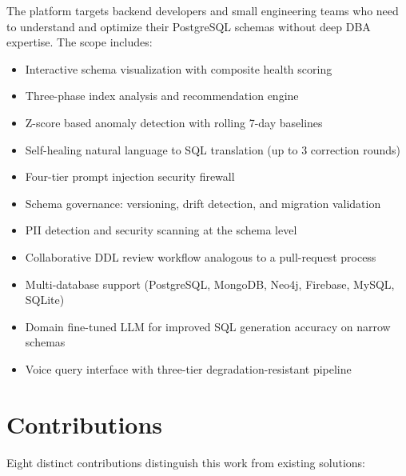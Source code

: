 \documentclass[12pt,a4paper]{report}
\begin{document}
The platform targets backend developers and small engineering teams who need to understand and optimize their PostgreSQL schemas without deep DBA expertise. The scope includes:

\begin{itemize}
    \item Interactive schema visualization with composite health scoring
    \item Three-phase index analysis and recommendation engine
    \item Z-score based anomaly detection with rolling 7-day baselines
    \item Self-healing natural language to SQL translation (up to 3 correction rounds)
    \item Four-tier prompt injection security firewall
    \item Schema governance: versioning, drift detection, and migration validation
    \item PII detection and security scanning at the schema level
    \item Collaborative DDL review workflow analogous to a pull-request process
    \item Multi-database support (PostgreSQL, MongoDB, Neo4j, Firebase, MySQL, SQLite)
    \item Domain fine-tuned LLM for improved SQL generation accuracy on narrow schemas
    \item Voice query interface with three-tier degradation-resistant pipeline
\end{itemize}

\section{Contributions}

Eight distinct contributions distinguish this work from existing solutions:
\end{document}
